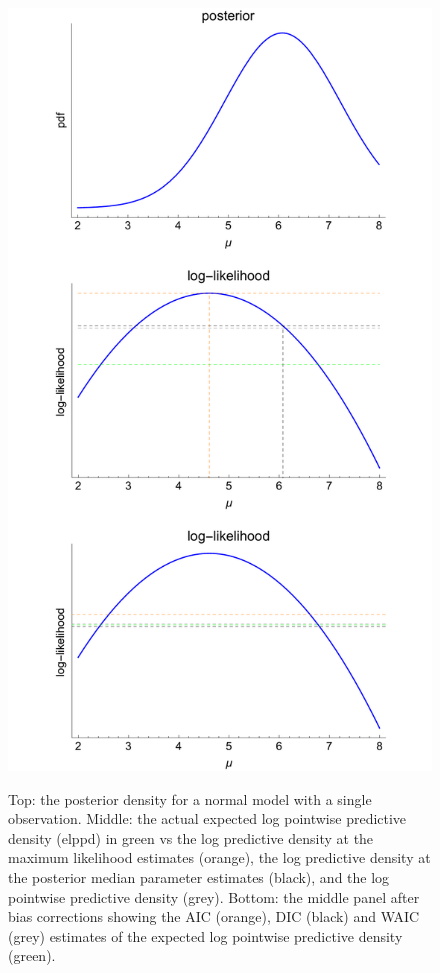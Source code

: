 \documentclass[11pt,fullpage]{book}
\begin{document}
\begin{figure}
\centering
\scalebox{0.5} 
{\includegraphics{Evaluation_DIC.pdf}}
\caption{Top: the posterior density for a normal model with a single observation. Middle: the actual expected log pointwise predictive density (elppd) in green vs the log predictive density at the maximum likelihood estimates (orange), the log predictive density at the posterior median parameter estimates (black), and the log pointwise predictive density (grey). Bottom: the middle panel after bias corrections showing the AIC (orange), DIC (black) and WAIC (grey) estimates of the expected log pointwise predictive density (green).}\label{fig:Evaluation_DIC}
\end{figure}
\end{document}
